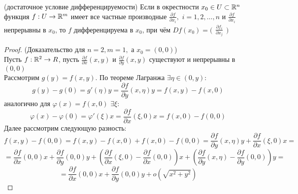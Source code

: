 \begin{theorem}
	(достаточное условие дифференцируемости) Если в окрестности $x_0 \in U \subset \mathbb{R}^n$ функция $f: U \to \mathbb{R}^m$ имеет все частные производные $\frac{\partial f}{\partial x_i},$ $i = 1,2,\ldots, n$ и $\frac{\partial f}{\partial x_i}$ непрерывны в $x_0$, то $f$ дифференцируема в $x_0$, при чём $Df(x_0) = \bigl(\begin{matrix} \frac{\partial f_i}{\partial x_j} \end{matrix} \bigr)$\\
\begin{proof}
	(Доказательство для $n = 2, m = 1, $ а $x_0 = (0, 0)$) \\
	Пусть $f : \mathbb{R}^2 \to R$, пусть $\frac{\partial f}{\partial x} (x, y)$ и $\frac{\partial f}{\partial y} (x, y)$ существуют и непрерывны в $(0, 0)$ \\
	Рассмотрим $g(y) = f(x, y)$. По теореме Лагранжа $\exists \eta \in (0, y) :$
\[ g(y) - g(0) = g'(\eta) y = \frac{\partial f}{\partial y} (x, \eta) y = f(x, y) - f(x, 0) \]
аналогично для $\varphi(x) = f(x, 0)$ $\exists \xi :$
\[  \varphi(x) - \varphi(0) = \varphi'(\xi)x = \frac{\partial f}{\partial x} (\xi, 0)x = f(x, 0) - f(0, 0) \]
Далее рассмотрим следующую разность:
	\[ f(x, y) - f(0, 0) = f(x, y) - f(x, 0) + f(x, 0) - f(0, 0) = \frac{\partial f}{\partial y} (x, \eta) y + \frac{\partial f}{\partial x} (\xi, 0)x = \]
	\[ = \frac{\partial f}{\partial x} (0, 0) x + \frac{\partial f}{\partial y} (0, 0)y + \left(\frac{\partial f}{\partial x} (\xi, 0) - \frac{\partial f}{\partial x} (0, 0)\right)x + \left(\frac{\partial f}{\partial y} (x, \eta) - \frac{\partial f}{\partial y} (0, 0)\right)y = \]
\[ = \frac{\partial f}{\partial x} (0, 0) x + \frac{\partial f}{\partial y} (0, 0)y + o(\sqrt{x^2 + y^2}) \]
\end{proof}
\end{theorem}






















